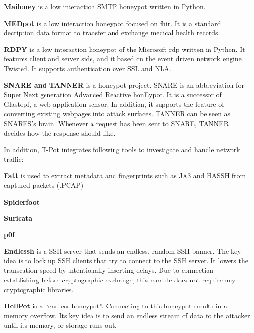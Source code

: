 \textbf{Mailoney} is a low interaction SMTP honeypot written in Python.

\textbf{MEDpot} \cite{medpot2021} is a low interaction honeypot focused on \ac{fhir}. It is a standard decription data format to transfer and exchange medical health records.

\textbf{RDPY} \cite{rdpy2021} is a low interaction honeypot of the Microsoft \ac{rdp} written in Python.
It features client and server side, and it based on the event driven network engine Twisted.
It supports authentication over SSL and NLA.

\textbf{SNARE and TANNER} \cite{snare2021, tanner2021} is a honeypot project.
SNARE is an abbreviation for Super Next generation Advanced Reactive honEypot.
It is a successor of Glastopf, a web application sensor.
In addition, it supports the feature of converting existing webpages into attack surfaces.
TANNER \cite{tanner2021} can be seen as SNARES's brain.
Whenever a request has been sent to SNARE, TANNER decides how the response should like.

In addition, T-Pot integrates following tools to investigate and handle network traffic:

\textbf{Fatt}\cite{fatt2021} is used to extract metadata and fingerprints such as JA3 and HASSH from captured packets (.PCAP)

\textbf{Spiderfoot}

\textbf{Suricata}

\textbf{p0f}

\textbf{Endlessh} \cite{endlessh2021} is a SSH server that sends an endless, random SSH banner.
The key idea is to lock up SSH clients that try to connect to the SSH server.
It lowers the transcation speed by intentionally inserting delays.
Due to connection establishing before cryptographic exchange, this module does not require any cryptographic libraries.

\textbf{HellPot} \cite{hellpot2021} is a \enquote{endless honeypot}.
Connecting to this honeypot results in a memory overflow.
Its key idea is to send an endless stream of data to the attacker until its memory, or storage runs out.


